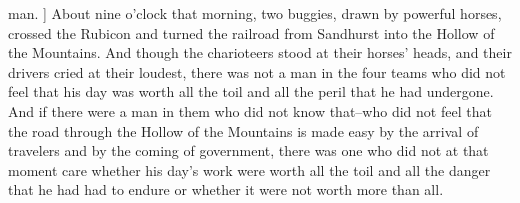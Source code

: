 \documentclass{article} \usepackage{iclr2020_conference,times}
\def\1{\bm{1}}
\begin{document}
{{man.
\1\baselineskip]
About nine o'clock that morning, two buggies, drawn by powerful
horses, crossed the Rubicon and turned the railroad from
Sandhurst into the Hollow of the Mountains. And though the
charioteers stood at their horses' heads, and their drivers cried at
their loudest, there was not a man in the four teams who did not feel
that his day was worth all the toil and all the peril that he had
undergone. And if there were a man in them who did not know
that--who did not feel that the road through the Hollow of the
Mountains is made easy by the arrival of travelers and by the coming
of government, there was one who did not at that moment care
whether his day's work were worth all the toil and all the danger
that he had had to endure or whether it were not worth more
than all.
}
}
\end{document}
